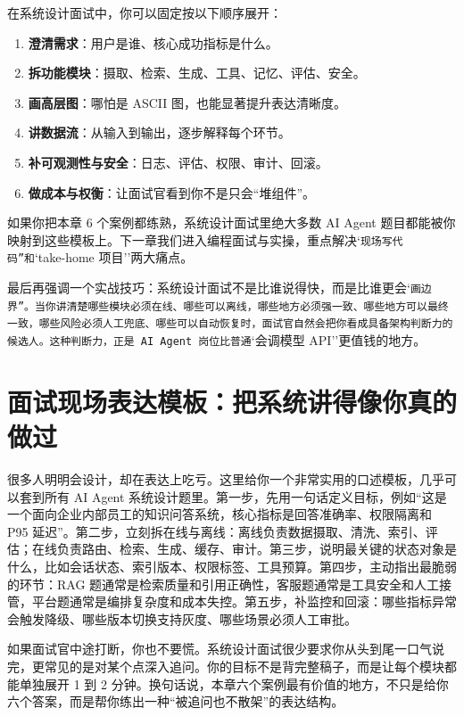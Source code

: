 在系统设计面试中，你可以固定按以下顺序展开：


\begin{enumerate}[leftmargin=2em]
\item \textbf{澄清需求}：用户是谁、核心成功指标是什么。
\item \textbf{拆功能模块}：摄取、检索、生成、工具、记忆、评估、安全。
\item \textbf{画高层图}：哪怕是 ASCII 图，也能显著提升表达清晰度。
\item \textbf{讲数据流}：从输入到输出，逐步解释每个环节。
\item \textbf{补可观测性与安全}：日志、评估、权限、审计、回滚。
\item \textbf{做成本与权衡}：让面试官看到你不是只会``堆组件''。
\end{enumerate}

如果你把本章 6 个案例都练熟，系统设计面试里绝大多数 AI Agent 题目都能被你映射到这些模板上。下一章我们进入编程面试与实操，重点解决`\texttt{现场写代码''和}`take-home 项目''两大痛点。


最后再强调一个实战技巧：系统设计面试不是比谁说得快，而是比谁更会`\texttt{画边界''。当你讲清楚哪些模块必须在线、哪些可以离线，哪些地方必须强一致、哪些地方可以最终一致，哪些风险必须人工兜底、哪些可以自动恢复时，面试官自然会把你看成具备架构判断力的候选人。这种判断力，正是 AI Agent 岗位比普通}`会调模型 API''更值钱的地方。


\section{面试现场表达模板：把系统讲得像你真的做过}

很多人明明会设计，却在表达上吃亏。这里给你一个非常实用的口述模板，几乎可以套到所有 AI Agent 系统设计题里。第一步，先用一句话定义目标，例如``这是一个面向企业内部员工的知识问答系统，核心指标是回答准确率、权限隔离和 P95 延迟''。第二步，立刻拆在线与离线：离线负责数据摄取、清洗、索引、评估；在线负责路由、检索、生成、缓存、审计。第三步，说明最关键的状态对象是什么，比如会话状态、索引版本、权限标签、工具预算。第四步，主动指出最脆弱的环节：RAG 题通常是检索质量和引用正确性，客服题通常是工具安全和人工接管，平台题通常是编排复杂度和成本失控。第五步，补监控和回滚：哪些指标异常会触发降级、哪些版本切换支持灰度、哪些场景必须人工审批。


如果面试官中途打断，你也不要慌。系统设计面试很少要求你从头到尾一口气说完，更常见的是对某个点深入追问。你的目标不是背完整稿子，而是让每个模块都能单独展开 1 到 2 分钟。换句话说，本章六个案例最有价值的地方，不只是给你六个答案，而是帮你练出一种``被追问也不散架''的表达结构。


